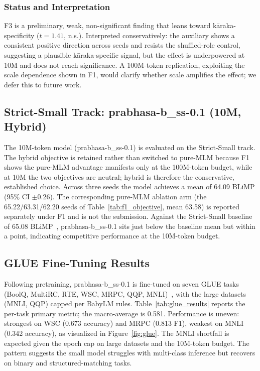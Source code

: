 \subsubsection{Status and Interpretation}

F3 is a preliminary, weak, non-significant finding that leans toward kāraka-specificity ($t = 1.41$, n.s.). Interpreted conservatively: the auxiliary shows a consistent positive direction across seeds and resists the shuffled-role control, suggesting a plausible kāraka-specific signal, but the effect is underpowered at 10M and does not reach significance. A 100M-token replication, exploiting the scale dependence shown in F1, would clarify whether scale amplifies the effect; we defer this to future work.

\subsection{Strict-Small Track: prabhasa-b\_ss-0.1 (10M, Hybrid)}

The 10M-token model (prabhasa-b\_ss-0.1) is evaluated on the Strict-Small track. The hybrid objective is retained rather than switched to pure-MLM because F1 shows the pure-MLM advantage manifests only at the 100M-token budget, while at 10M the two objectives are neutral; hybrid is therefore the conservative, established choice. Across three seeds the model achieves a mean of 64.09 BLiMP (95\% CI $\pm$0.26). The corresponding pure-MLM ablation arm (the 65.22/63.31/62.20 seeds of Table~\ref{tab:f1_objective}, mean 63.58) is reported separately under F1 and is not the submission. Against the Strict-Small baseline of 65.08 BLiMP~\cite{Hu2024BabyLM}, prabhasa-b\_ss-0.1 sits just below the baseline mean but within a point, indicating competitive performance at the 10M-token budget.

\subsection{GLUE Fine-Tuning Results}

Following pretraining, prabhasa-b\_ss-0.1 is fine-tuned on seven GLUE tasks (BoolQ, MultiRC, RTE, WSC, MRPC, QQP, MNLI)~\cite{Wang2019GLUE}, with the large datasets (MNLI, QQP) capped per BabyLM rules. Table~\ref{tab:glue_results} reports the per-task primary metric; the macro-average is 0.581. Performance is uneven: strongest on WSC (0.673 accuracy) and MRPC (0.813 F1), weakest on MNLI (0.342 accuracy), as visualized in Figure~\ref{fig:glue}. The MNLI shortfall is expected given the epoch cap on large datasets and the 10M-token budget. The pattern suggests the small model struggles with multi-class inference but recovers on binary and structured-matching tasks.

